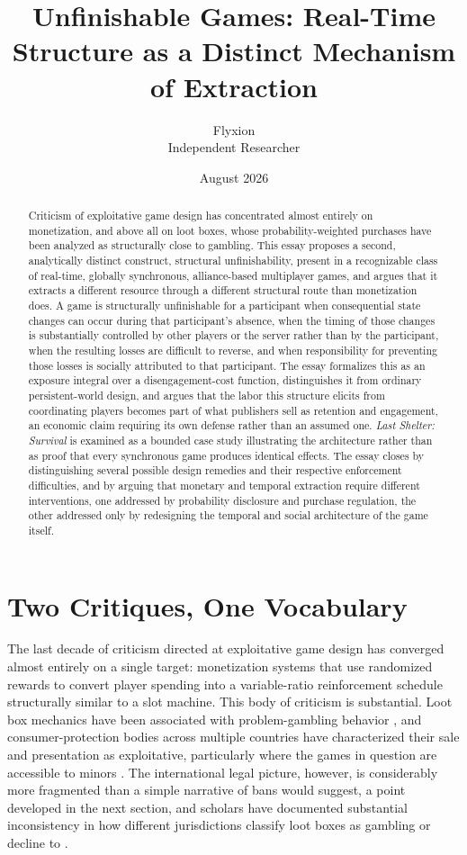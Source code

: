 \documentclass[11pt]{article}
\title{Unfinishable Games: Real-Time Structure as a Distinct Mechanism of Extraction}
\author{Flyxion \\ \small Independent Researcher}
\date{August 2026}
\begin{document}
\maketitle

\begin{abstract}
Criticism of exploitative game design has concentrated almost entirely on monetization, and above all on loot boxes, whose probability-weighted purchases have been analyzed as structurally close to gambling. This essay proposes a second, analytically distinct construct, structural unfinishability, present in a recognizable class of real-time, globally synchronous, alliance-based multiplayer games, and argues that it extracts a different resource through a different structural route than monetization does. A game is structurally unfinishable for a participant when consequential state changes can occur during that participant's absence, when the timing of those changes is substantially controlled by other players or the server rather than by the participant, when the resulting losses are difficult to reverse, and when responsibility for preventing those losses is socially attributed to that participant. The essay formalizes this as an exposure integral over a disengagement-cost function, distinguishes it from ordinary persistent-world design, and argues that the labor this structure elicits from coordinating players becomes part of what publishers sell as retention and engagement, an economic claim requiring its own defense rather than an assumed one. \emph{Last Shelter: Survival} is examined as a bounded case study illustrating the architecture rather than as proof that every synchronous game produces identical effects. The essay closes by distinguishing several possible design remedies and their respective enforcement difficulties, and by arguing that monetary and temporal extraction require different interventions, one addressed by probability disclosure and purchase regulation, the other addressed only by redesigning the temporal and social architecture of the game itself.
\end{abstract}

\section{Two Critiques, One Vocabulary}

The last decade of criticism directed at exploitative game design has converged almost entirely on a single target: monetization systems that use randomized rewards to convert player spending into a variable-ratio reinforcement schedule structurally similar to a slot machine. This body of criticism is substantial. Loot box mechanics have been associated with problem-gambling behavior \cite{zendle2019}, and consumer-protection bodies across multiple countries have characterized their sale and presentation as exploitative, particularly where the games in question are accessible to minors \cite{nccreport2022}. The international legal picture, however, is considerably more fragmented than a simple narrative of bans would suggest, a point developed in the next section, and scholars have documented substantial inconsistency in how different jurisdictions classify loot boxes as gambling or decline to \cite{xiao2021}.
\end{document}
